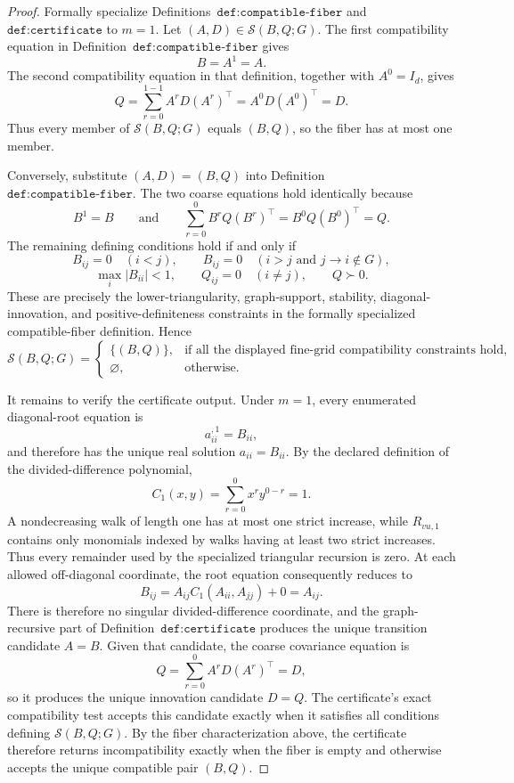 \documentclass{article}
\begin{document}
\begin{proof}
Formally specialize Definitions~\(\texttt{def:compatible-fiber}\) and \(\texttt{def:certificate}\) to \(m=1\). Let \((A,D)\in\mathcal S(B,Q;G)\). The first compatibility equation in Definition~\(\texttt{def:compatible-fiber}\) gives
\[
B=A^1=A.
\]
The second compatibility equation in that definition, together with \(A^0=I_d\), gives
\[
Q=\sum_{r=0}^{1-1}A^rD(A^r)^\top
  =A^0D(A^0)^\top
  =D.
\]
Thus every member of \(\mathcal S(B,Q;G)\) equals \((B,Q)\), so the fiber has at most one member.

Conversely, substitute \((A,D)=(B,Q)\) into Definition~\(\texttt{def:compatible-fiber}\). The two coarse equations hold identically because
\[
B^1=B
\qquad\text{and}\qquad
\sum_{r=0}^{0}B^rQ(B^r)^\top=B^0Q(B^0)^\top=Q.
\]
The remaining defining conditions hold if and only if
\[
B_{ij}=0\quad(i<j),
\qquad
B_{ij}=0\quad(i>j\text{ and }j\to i\notin G),
\]
\[
\max_i|B_{ii}|<1,
\qquad
Q_{ij}=0\quad(i\ne j),
\qquad
Q\succ0.
\]
These are precisely the lower-triangularity, graph-support, stability, diagonal-innovation, and positive-definiteness constraints in the formally specialized compatible-fiber definition. Hence
\[
\mathcal S(B,Q;G)=
\begin{cases}
\{(B,Q)\},&\text{if all the displayed fine-grid compatibility constraints hold},\\
\varnothing,&\text{otherwise}.
\end{cases}
\]

It remains to verify the certificate output. Under \(m=1\), every enumerated diagonal-root equation is
\[
a_{ii}^{,1}=B_{ii},
\]
and therefore has the unique real solution \(a_{ii}=B_{ii}\). By the declared definition of the divided-difference polynomial,
\[
C_1(x,y)=\sum_{r=0}^{0}x^r y^{0-r}=1.
\]
A nondecreasing walk of length one has at most one strict increase, while \(R_{vu,1}\) contains only monomials indexed by walks having at least two strict increases. Thus every remainder used by the specialized triangular recursion is zero. At each allowed off-diagonal coordinate, the root equation consequently reduces to
\[
B_{ij}=A_{ij}C_1(A_{ii},A_{jj})+0=A_{ij}.
\]
There is therefore no singular divided-difference coordinate, and the graph-recursive part of Definition~\(\texttt{def:certificate}\) produces the unique transition candidate \(A=B\). Given that candidate, the coarse covariance equation is
\[
Q=\sum_{r=0}^{0}A^rD(A^r)^\top=D,
\]
so it produces the unique innovation candidate \(D=Q\). The certificate's exact compatibility test accepts this candidate exactly when it satisfies all conditions defining \(\mathcal S(B,Q;G)\). By the fiber characterization above, the certificate therefore returns incompatibility exactly when the fiber is empty and otherwise accepts the unique compatible pair \((B,Q)\).


\end{proof}
\end{document}
